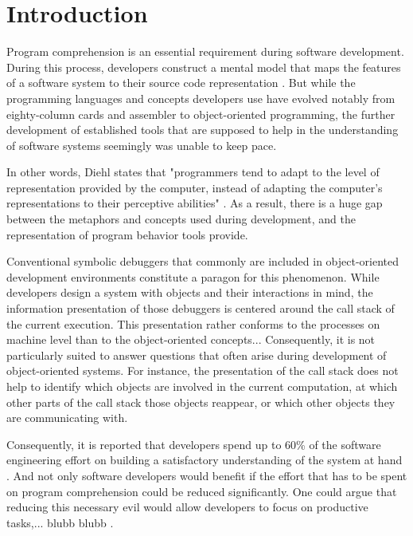\chapter{Introduction}
\label{c:introduction}

Program comprehension is an essential requirement during software development.
During this process, developers construct a mental model that maps the features of a software system to their source code representation \cite{latoza_maintaining_2006}.
But while the programming languages and concepts developers use have evolved notably from eighty-column cards and assembler to object-oriented programming, the further development of established tools that are supposed to help in the understanding of software systems seemingly was unable to keep pace.

In other words, Diehl states that "programmers tend to adapt to the level of representation provided by the computer, instead of adapting the computer's representations to their perceptive abilities" \cite{diehl_software_2007}.
As a result, there is a huge gap between the metaphors and concepts used during development, and the representation of program behavior tools provide.

Conventional symbolic debuggers that commonly are included in object-oriented development environments constitute a paragon for this phenomenon.
While developers design a system with objects and their interactions in mind, the information presentation of those debuggers is centered around the call stack of the current execution.
This presentation rather conforms to the processes on machine level than to the object-oriented concepts...
Consequently, it is not particularly suited to answer questions that often arise during development of object-oriented systems.
For instance, the presentation of the call stack does not help to identify which objects are involved in the current computation, at which other parts of the call stack those objects reappear, or which other objects they are communicating with.

Consequently, it is reported that developers spend up to 60\% of the software engineering effort on building a satisfactory understanding of the system at hand \cite{corbi_program_1989, basili_evolving_1997, ducasse_class_2005, rothlisberger_feature_2007, cornelissen_execution_2008}.
And not only software developers would benefit if the effort that has to be spent on program comprehension could be reduced significantly.
One could argue that reducing this necessary evil would allow developers to focus on productive tasks,... blubb blubb .

